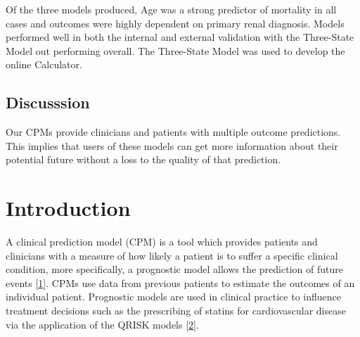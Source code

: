 \documentclass[
]{article}
\begin{document}
Of the three models produced, Age was a strong predictor of mortality in all cases and outcomes were highly dependent on primary renal diagnosis. Models performed well in both the internal and external validation with the Three-State Model out performing overall. The Three-State Model was used to develop the online Calculator.

\hypertarget{discusssion}{%
\subsection*{Discusssion}\label{discusssion}}

Our CPMs provide clinicians and patients with multiple outcome predictions. This implies that users of these models can get more information about their potential future without a loss to the quality of that prediction.

\hypertarget{introduction-1}{%
\section{Introduction}\label{introduction-1}}

A clinical prediction model (CPM) is a tool which provides patients and clinicians with a measure of how likely a patient is to suffer a specific clinical condition, more specifically, a prognostic model allows the prediction of future events {[}\protect\hyperlink{ref-steyerberg_prognosis_2013}{1}{]}. CPMs use data from previous patients to estimate the outcomes of an individual patient. Prognostic models are used in clinical practice to influence treatment decisions such as the prescribing of statins for cardiovascular disease via the application of the QRISK models {[}\protect\hyperlink{ref-hippisley-cox_development_2017}{2}{]}.
\end{document}
